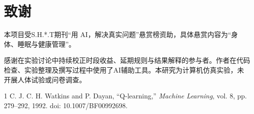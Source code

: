 \documentclass[journal]{IEEEtran}
\begin{document}
\section*{致谢}
本项目受S.H.*.T期刊“用 AI，解决真实问题”悬赏榜资助，具体悬赏内容为“身体、睡眠与健康管理”。


感谢在实验讨论中持续校正时段收益、延期规则与结果解释的参与者。作者在代码检查、实验整理及撰写过程中使用了AI辅助工具。本研究为计算机仿真实验，未开展人体试验或问卷调查。

\begin{thebibliography}{1}
C. J. C. H. Watkins and P. Dayan, ``Q-learning,'' \textit{Machine Learning}, vol. 8, pp. 279--292, 1992. doi: 10.1007/BF00992698.
\end{thebibliography}
\end{document}
